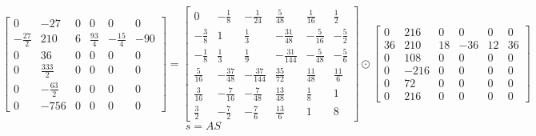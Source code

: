 \documentclass{article}%
\begin{document}
\[%
\left[\begin{matrix}0 & -27 & 0 & 0 & 0 & 0\\- \frac{27}{2} & 210 & 6 & \frac{93}{4} & - \frac{15}{4} & -90\\0 & 36 & 0 & 0 & 0 & 0\\0 & \frac{333}{2} & 0 & 0 & 0 & 0\\0 & - \frac{63}{2} & 0 & 0 & 0 & 0\\0 & -756 & 0 & 0 & 0 & 0\end{matrix}\right] = \left[\begin{matrix}0 & - \frac{1}{8} & - \frac{1}{24} & \frac{5}{48} & \frac{1}{16} & \frac{1}{2}\\- \frac{3}{8} & 1 & \frac{1}{3} & - \frac{31}{48} & - \frac{5}{16} & - \frac{5}{2}\\- \frac{1}{8} & \frac{1}{3} & \frac{1}{9} & - \frac{31}{144} & - \frac{5}{48} & - \frac{5}{6}\\\frac{5}{16} & - \frac{37}{48} & - \frac{37}{144} & \frac{35}{72} & \frac{11}{48} & \frac{11}{6}\\\frac{3}{16} & - \frac{7}{16} & - \frac{7}{48} & \frac{13}{48} & \frac{1}{8} & 1\\\frac{3}{2} & - \frac{7}{2} & - \frac{7}{6} & \frac{13}{6} & 1 & 8\end{matrix}\right] \odot \left[\begin{matrix}0 & 216 & 0 & 0 & 0 & 0\\36 & 210 & 18 & -36 & 12 & 36\\0 & 108 & 0 & 0 & 0 & 0\\0 & -216 & 0 & 0 & 0 & 0\\0 & 72 & 0 & 0 & 0 & 0\\0 & 216 & 0 & 0 & 0 & 0\end{matrix}\right]%
\]%
\[%
s = AS%
\]%
\end{document}
